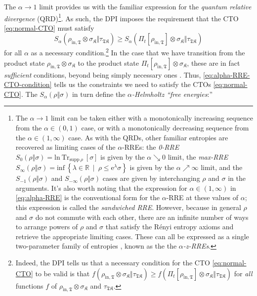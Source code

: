 \documentclass[preprints,article,accept,moreauthors,pdftex]{Definitions/mdpi}
\begin{document}
\begin{paracol}{2}
\switchcolumn
The $\alpha \rightarrow 1$ limit provides us with the familiar expression for the \emph{quantum relative divergence} (QRD)\footnote{The $\alpha \rightarrow 1$ limit can be taken either with a monotonically increasing sequence from the $\alpha \in \left(0,1\right)$ case, or with a monotonically decreasing sequence from the $\alpha \in \left(1,\infty\right)$ case. As with the QRDs, other familiar entropies are recovered as limiting cases of the $\alpha$-RREs: the \emph{0-RRE} $S_{0}\left(\rho\Vert\sigma\right) = \mathrm{ln}\:\mathrm{Tr}_{\mathrm{supp}\:\rho}\:\left[\sigma\right]$ is given by the $\alpha \searrow 0$ limit, the \emph{max-RRE} $S_{\infty}\left(\rho\Vert\sigma\right) = \mathrm{inf}\:\!\left\{\lambda\in\mathbb{R}\:\mid\:\rho\leq \mathrm{e}^{\lambda}\sigma\right\}$ is given by the $\alpha \nearrow \infty$ limit, and the $S_{-1}\left(\rho\Vert\sigma\right)$ and $S_{-\infty}\left(\rho\Vert\sigma\right)$ cases are given by interchanging $\rho$ and $\sigma$ in the arguments. It's also worth noting that the expression for $\alpha\in\left(1,\infty\right)$ in \eqref{eq:alpha-RRE} is the conventional form for the $\alpha$-RRE at these values of $\alpha$; this expression is called the \emph{sandwiched RRE}. However, because in general $\rho$ and $\sigma$ do not commute with each other, there are an infinite number of ways to arrange powers of $\rho$ and $\sigma$ that satisfy the Rényi entropy axioms \cite{Renyi55} and retrieve the appropriate limiting cases. These can all be expressed as a single two-parameter family of entropies \cite{AD15}, known as the the $\alpha$\emph{-z-RREs}.}. As such, the DPI imposes the requirement that the CTO \eqref{eq:normal-CTO} must satisfy
\begin{equation}
    \label{eq:alpha-RRE-CTO-condition}
    S_{\alpha}\left(\rho_{\mathrm{in},\mathfrak{T}}\otimes\sigma_{\mathfrak{K}}\Vert\tau_{\mathfrak{TK}}\right) \geq S_{\alpha}\left(\Pi_{t}\left[\rho_{\mathrm{in},\mathfrak{T}}\right]\otimes\sigma_{\mathfrak{K}}\Vert\tau_{\mathfrak{TK}}\right)
\end{equation}
for all $\alpha$ as a necessary condition.\footnote{Indeed, the DPI tells us that a necessary condition for the CTO \eqref{eq:normal-CTO} to be valid is that $f\left(\rho_{\mathrm{in},\mathfrak{T}}\otimes\sigma_{\mathfrak{K}}\Vert\tau_{\mathfrak{TK}}\right)\geq f\left(\Pi_{t}\left[\rho_{\mathrm{in},\mathfrak{T}}\right]\otimes\sigma_{\mathfrak{K}}\Vert\tau_{\mathfrak{TK}}\right)$ for \emph{all} functions $f$ of $\rho_{\mathrm{in},\mathfrak{T}}\otimes\sigma_{\mathfrak{K}}$ and $\tau_{\mathfrak{TK}}$.} In the case that we have transition from the product state $\rho_{\mathrm{in},\mathfrak{T}}\otimes\sigma_{\mathfrak{K}}$ to the product state $\Pi_{t}\left[\rho_{\mathrm{in},\mathfrak{T}}\right]\otimes\sigma_{\mathfrak{K}}$, these are in fact \emph{sufficient} conditions, beyond being simply necessary ones \cite{Klimesh04, Klimesh07, Turgut07}. Thus, \eqref{eq:alpha-RRE-CTO-condition} tells us the constraints we need to satisfy the CTOs \eqref{eq:normal-CTO}. The $S_{\alpha}\left(\rho\Vert\sigma\right)$ in turn define \cite{BHNOW15} the $\alpha$\emph{-Helmholtz ``free energies}:''

\end{paracol}
\end{document}

